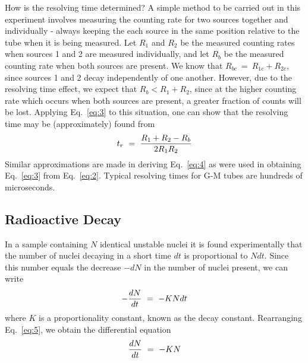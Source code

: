 How is the resolving time determined?  A simple method to be carried
out in this experiment involves measuring the counting rate for two
sources together and individually - always keeping the each source in
the same position relative to the tube when it is being measured.  Let
$R_{1}$ and $R_{2}$ be the measured counting
rates when sources 1 and 2 are measured individually, and let
$R_{b}$ be the measured counting rate when both sources are
present. We know that $R_{bc} ~=~ R_{1c} + R_{2c }$,
since sources 1 and 2 decay independently of one
another.  However, due to the resolving time effect, we expect that
$R_{b} < R_{1} + R_{2}$, since at the higher counting rate which occurs when both sources are
present, a greater fraction of counts will be lost.  Applying  Eq.~\ref{eq:3}
to this situation, one can show that the resolving time may be
(approximately) found from
\begin{equation}
t_r ~=~ { R_1 + R_2 - R_b \over 2 R_1 R_2 }
\label{eq:4}
\end{equation}
Similar approximations are made in deriving Eq.~\ref{eq:4} as were used in
obtaining Eq.~\ref{eq:3} from Eq.~\ref{eq:2}.  Typical resolving times for G-M tubes
are hundreds of microseconds.

\subsection{Radioactive Decay}
\label{sec:rad-decay}

In a sample containing $N$ identical unstable nuclei it is found
experimentally that the number of nuclei decaying in a short time $dt$ is
proportional to $N dt$.  Since this number equals the decrease $-dN$
in the number of nuclei present, we can write
\begin{equation}
- {dN \over dt} ~=~ -K N dt
\label{eq:5}
\end{equation}
where $K$ is a proportionality constant, known as the decay constant.
Rearranging Eq.~\ref{eq:5}, we obtain the differential equation
\begin{equation}
{dN \over dt} ~=~ -K N
\label{eq:6}
\end{equation}


